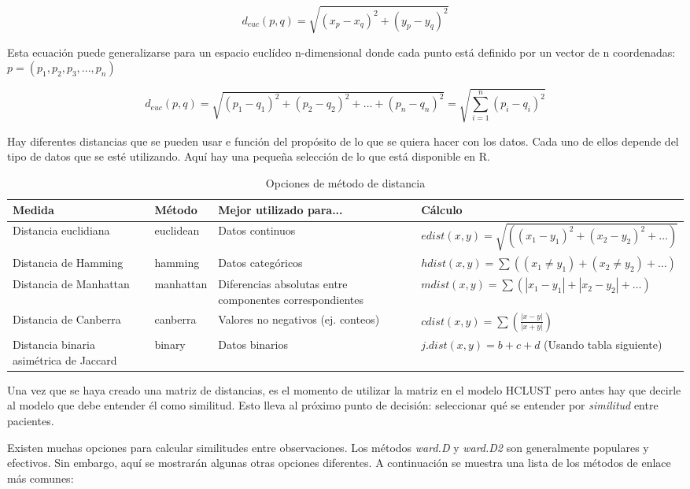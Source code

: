 \[
d_{euc}(p,q) = \sqrt{(x_p - x_q)^2 + (y_p - y_q)^2}
\]

Esta ecuación puede generalizarse para un espacio euclídeo n-dimensional donde cada punto está definido por un vector de n coordenadas: $p = (p_1,p_2,p_3,...,p_n)$

\[
d_{euc}(p,q) = \sqrt{(p_1 - q_1)^2 + (p_2 - q_2)^2 + \ldots + (p_n - q_n)^2} = \sqrt{\sum_{i=1}^{n}(p_i - q_i)^2}
\]

Hay diferentes distancias que se pueden usar e función del propósito de lo que se quiera hacer con los datos. Cada uno de ellos depende del tipo de datos que se esté utilizando. Aquí hay una pequeña selección de lo que está disponible en R.
\begin{table}[H]
    \centering
    \caption{Opciones de método de distancia}
    \begin{tabular}{|p{3cm}|p{3cm}|p{4.5cm}|p{6cm}|}
    \hline
    \textbf{Medida} & \textbf{Método} & \textbf{Mejor utilizado para...} & \textbf{Cálculo} \\
    \hline
    Distancia euclidiana & euclidean & Datos continuos & \(edist(x, y) = \sqrt{((x_1 - y_1)^2 + (x_2 - y_2)^2 + \ldots)}\) \\
    \hline
    Distancia de Hamming & hamming & Datos categóricos & \(hdist(x, y) = \sum((x_1 \neq y_1) + (x_2 \neq y_2) + \ldots)\) \\
    \hline
    Distancia de Manhattan & manhattan & Diferencias absolutas entre componentes correspondientes & \(mdist(x, y) = \sum(|x_1 - y_1| + |x_2 - y_2| + \ldots)\) \\
    \hline
    Distancia de Canberra & canberra & Valores no negativos (ej. conteos) & \(cdist(x, y) = \sum\left(\frac{|x - y|}{|x + y|}\right)\) \\
    \hline
    Distancia binaria asimétrica de Jaccard & binary & Datos binarios & \(j.dist(x, y) = b + c + d\) (Usando tabla siguiente) \\
    \hline
    \end{tabular}
\end{table}

Una vez que se haya creado una matriz de distancias, es el momento de utilizar la matriz en el modelo HCLUST pero antes hay que decirle al modelo que debe entender él como similitud. Esto lleva al próximo punto de decisión: seleccionar qué se entender por \textit{similitud} entre pacientes.

Existen muchas opciones para calcular similitudes entre observaciones. Los métodos \textit{ward.D} y \textit{ward.D2} son generalmente populares y efectivos. Sin embargo, aquí se mostrarán algunas otras opciones diferentes. A continuación se muestra una lista de los métodos de enlace más comunes:


